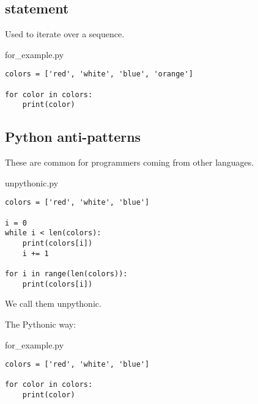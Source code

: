 \documentclass[aspectratio=1610,t]{beamer}
\begin{document}
\subsection{ statement}
\begin{pframe}
 Used to iterate over a sequence.
 \begin{pythonfile}{for\_example.py}
  \begin{verbatim}
colors = ['red', 'white', 'blue', 'orange']

for color in colors:
    print(color)
  \end{verbatim}
 \end{pythonfile}
 \pause
 \begin{terminal}
 \end{terminal}
\end{pframe}


\subsection{Python anti-patterns}
\begin{pframe}
 \begin{minipage}[t]{0.48\textwidth}
  These are common for programmers coming from other languages.
  \begin{pythonfile}{unpythonic.py}
   \begin{verbatim}
colors = ['red', 'white', 'blue']

i = 0
while i < len(colors):
    print(colors[i])
    i += 1

for i in range(len(colors)):
    print(colors[i])
   \end{verbatim}
  \end{pythonfile}
  We call them unpythonic.
 \end{minipage}\qquad%
 \begin{minipage}[t]{0.48\textwidth}
  The Pythonic way:
  \begin{pythonfile}{for\_example.py}
   \begin{verbatim}
colors = ['red', 'white', 'blue']

for color in colors:
    print(color)
   \end{verbatim}
  \end{pythonfile}
 \end{minipage}\qquad
\end{pframe}
\end{document}
